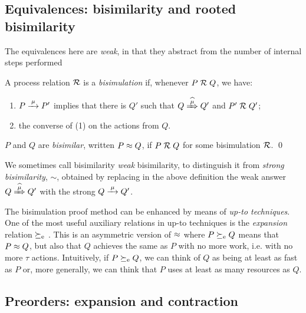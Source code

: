 


\subsection{Equivalences: bisimilarity and rooted bisimilarity}
\label{ss:BiEx}

The equivalences here are 
 \emph{weak}, in that they
abstract from the number of internal steps performed
\begin{definition}[bisimilarity]
\label{d:wb}
A process relation ${{\cal R}}$ 
 is a \emph{bisimulation} if, whenever
 $P\mathrel{\cal R} Q$, %
we have:
\begin{enumerate}
\item 
    $P \arr\mu P'$   implies that there is $Q'$ such that $Q \Arcap
\mu Q'$ and $P' 
\mathrel{\cal R} Q'$;

\item the converse of (1)
 on the actions from $Q$.
\end{enumerate}  
 $P$ and $Q$ are \emph{bisimilar},
written $P \approx
 Q$, if $P \mathrel{\cal R} Q$ for some  bisimulation ${\cal R}$.  
\qed\end{definition} 

We sometimes call bisimilarity \emph{weak} bisimilarity, to
distinguish it from \emph{strong bisimilarity}, $\sim$,
obtained by replacing in the above definition   the weak answer $
Q\Arcap\mu Q'$ with the strong  $Q \arr \mu Q'$.

The bisimulation proof method can be enhanced by means of \emph{up-to
  techniques}. One of the most useful auxiliary relations in up-to
techniques  is the \emph{expansion} relation  $\mathrel{\succeq_{\rm{e}}}$ \cite{SaMi92}. This is an asymmetric version
of $\approx$ where $P \mathrel{\succeq_{\rm{e}}} Q$  means that 
 $P \approx Q$,
but also that $Q$  achieves  the same as  $P$ 
with  no more work, i.e. with no more $\tau$ actions.
Intuitively, if $ P \mathrel{\succeq_{\rm{e}}} Q$, we can think of $Q$ as being 
at least as fast as $P$
or, more generally, we can think that $P$  uses at least as many resources as $Q$. 



\subsection{Preorders: expansion and contraction}


